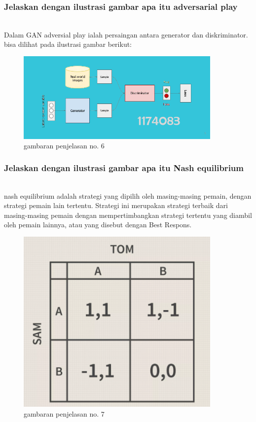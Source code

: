 \subsubsection{Jelaskan dengan ilustrasi gambar apa itu adversarial play}
\hfill\\
Dalam GAN adversial play ialah persaingan antara generator dan diskriminator. bisa dilihat pada ilustrasi gambar berikut:
\begin{figure}[H]
	\centering
	\includegraphics[width=10cm]{figures/1174083/figures8/6.png}
	\caption{gambaran penjelasan no. 6}
\end{figure}

\subsubsection{Jelaskan dengan ilustrasi gambar apa itu Nash equilibrium}
\hfill\\
nash equilibrium adalah strategi yang dipilih oleh masing-masing pemain, dengan strategi pemain lain tertentu.  Strategi ini merupakan strategi terbaik dari masing-masing pemain dengan mempertimbangkan strategi tertentu yang diambil oleh pemain lainnya, atau yang disebut dengan Best Respons.
\begin{figure}[H]
	\centering
	\includegraphics[width=10cm]{figures/1174083/figures8/7.png}
	\caption{gambaran penjelasan no. 7}
\end{figure}

